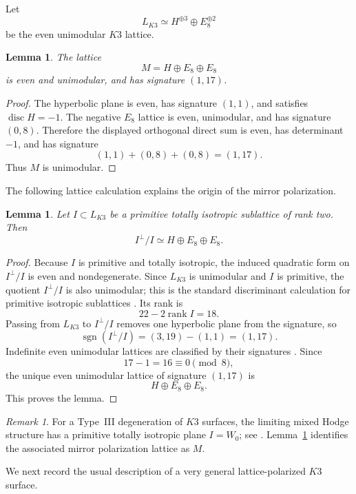 \documentclass[11pt]{amsart}
\newtheorem{lemma}[theorem]{Lemma}
\theoremstyle{definition}
\theoremstyle{remark}
\newtheorem{remark}[theorem]{Remark}
\DeclareMathOperator{\rank}{rank}
\DeclareMathOperator{\disc}{disc}
\DeclareMathOperator{\sgn}{sgn}
\begin{document}
Let
\[
L_{K3}\simeq H^{\oplus 3}\oplus E_8^{\oplus 2}
\]
be the even unimodular $K3$ lattice.

\begin{lemma}\label{lem:M-lattice}
The lattice
\[
M=H\oplus E_8\oplus E_8
\]
is even and unimodular, and has signature $(1,17)$.
\end{lemma}

\begin{proof}
The hyperbolic plane is even, has signature $(1,1)$, and satisfies
$\disc H=-1$.  The negative $E_8$ lattice is even, unimodular, and has
signature $(0,8)$.  Therefore the displayed orthogonal direct sum is even,
has determinant $-1$, and has signature
\[
(1,1)+(0,8)+(0,8)=(1,17).
\]
Thus $M$ is unimodular.
\end{proof}

The following lattice calculation explains the origin of the mirror
polarization.

\begin{lemma}\label{lem:cusp-quotient}
Let $I\subset L_{K3}$ be a primitive totally isotropic sublattice of rank
two.  Then
\[
I^\perp/I\simeq H\oplus E_8\oplus E_8.
\]
\end{lemma}

\begin{proof}
Because $I$ is primitive and totally isotropic, the induced quadratic form on
$I^\perp/I$ is even and nondegenerate.  Since $L_{K3}$ is unimodular and $I$
is primitive, the quotient $I^\perp/I$ is also unimodular; this is the
standard discriminant calculation for primitive isotropic sublattices
\cite{nikulin}.  Its rank is
\[
22-2\rank I=18.
\]
Passing from $L_{K3}$ to $I^\perp/I$ removes one hyperbolic plane from the
signature, so
\[
\sgn(I^\perp/I)=(3,19)-(1,1)=(1,17).
\]
Indefinite even unimodular lattices are classified by their signatures
\cite{nikulin}.  Since
\[
17-1=16\equiv 0\pmod 8,
\]
the unique even unimodular lattice of signature $(1,17)$ is
\[
H\oplus E_8\oplus E_8.
\]
This proves the lemma.
\end{proof}

\begin{remark}
For a Type~III degeneration of $K3$ surfaces, the limiting mixed Hodge
structure has a primitive totally isotropic plane $I=W_0$; see
\cite{schmid,kulikov}.  Lemma~\ref{lem:cusp-quotient} identifies the
associated mirror polarization lattice as $M$.
\end{remark}

We next record the usual description of a very general lattice-polarized
$K3$ surface.
\end{document}
